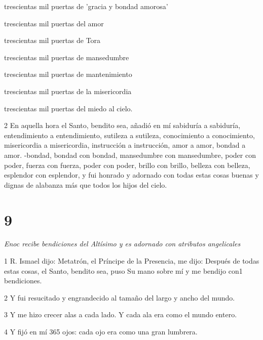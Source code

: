 \par trescientas mil puertas de 'gracia y bondad amorosa'

\par trescientas mil puertas del amor

\par trescientas mil puertas de Tora

\par trescientas mil puertas de mansedumbre

\par trescientas mil puertas de mantenimiento

\par trescientas mil puertas de la misericordia

\par trescientas mil puertas del miedo al cielo.

\par 2 En aquella hora el Santo, bendito sea, añadió en mí sabiduría a sabiduría, entendimiento a entendimiento, sutileza a sutileza, conocimiento a conocimiento, misericordia a misericordia, instrucción a instrucción, amor a amor, bondad a amor. -bondad, bondad con bondad, mansedumbre con mansedumbre, poder con poder, fuerza con fuerza, poder con poder, brillo con brillo, belleza con belleza, esplendor con esplendor, y fui honrado y adornado con todas estas cosas buenas y dignas de alabanza más que todos los hijos del cielo.


\chapter{9}

\par \textit{Enoc recibe bendiciones del Altísimo y es adornado con atributos angelicales}

\par 1 R. Ismael dijo: Metatrón, el Príncipe de la Presencia, me dijo: Después de todas estas cosas, el Santo, bendito sea, puso Su mano sobre mí y me bendijo con1 bendiciones.

\par 2 Y fui resucitado y engrandecido al tamaño del largo y ancho del mundo.

\par 3 Y me hizo crecer alas a cada lado. Y cada ala era como el mundo entero.

\par 4 Y fijó en mí 365 ojos: cada ojo era como una gran lumbrera.

